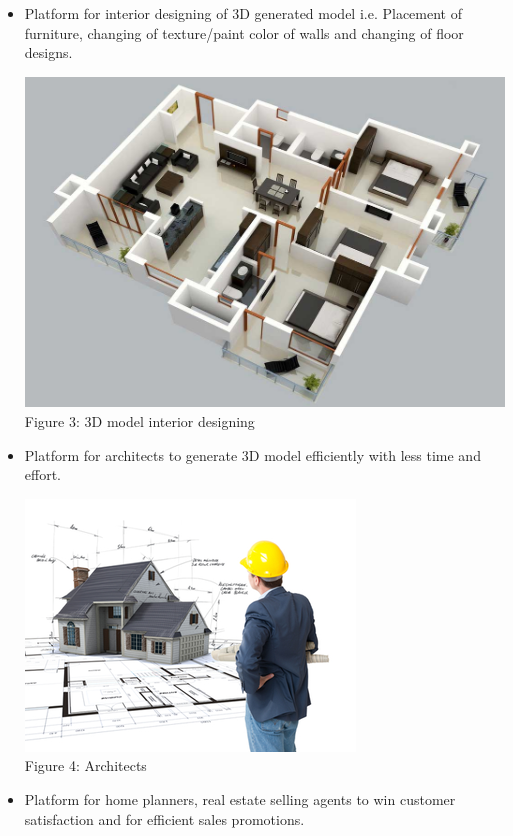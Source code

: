 \documentclass{article}
\begin{document}
\begin{itemize}
\item Platform for interior designing of 3D generated model i.e.  Placement of furniture, changing of texture/paint color of walls and changing of floor designs.
\begin{center}
\includegraphics[scale=0.3]{3dhome}
\\Figure 3: 3D model interior designing
\end{center}
\item Platform for architects to generate 3D model efficiently with less time and effort.
\begin{center}
\includegraphics[scale=0.7]{architect}
\\Figure 4: Architects
\end{center}
\item Platform for home planners, real estate selling agents to win customer satisfaction and for efficient sales promotions.
\begin{center}

\end{center}
\end{itemize}
\end{document}
